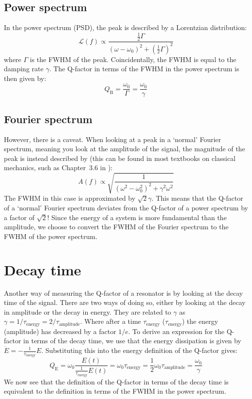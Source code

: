 \subsection{Power spectrum}
In the power spectrum (PSD), the peak is described by a Lorentzian distribution:
\begin{equation}
    \mathcal{L}(f) \propto \frac{\frac{1}{2} \Gamma}{(\omega - \omega_0)^2 + \left(\frac{1}{2} \Gamma\right)^2}
\end{equation}
where $\Gamma$ is the FWHM of the peak. Coincidentally, the FWHM is equal to the damping rate $\gamma$. The Q-factor in terms of the FWHM in the power spectrum is then given by:
\begin{equation}
    Q_\text{B} = \frac{\omega_0}{\Gamma} = \frac{\omega_0}{\gamma}
\end{equation}

\subsection{Fourier spectrum}
However, there is a caveat. When looking at a peak in a `normal' Fourier spectrum, meaning you look at the amplitude of the signal, the magnitude of the peak is instead described by (this can be found in most textbooks on classical mechanics, such as Chapter~3.6 in \textcite{fowles_analytical_2005}):
\begin{equation}
    A(f) \propto \sqrt{\frac{1}{(\omega^2 - \omega_0^2)^2 + \gamma^2\omega^2}}
\end{equation}
The FWHM in this case is approximated by $\sqrt{2}\gamma$. This means that the Q-factor of a `normal' Fourier spectrum deviates from the Q-factor of a power spectrum by a factor of $\sqrt{2}$! Since the energy of a system is more fundamental than the amplitude, we choose to convert the FWHM of the Fourier spectrum to the FWHM of the power spectrum.

\section{Decay time}
Another way of measuring the Q-factor of a resonator is by looking at the decay time of the signal. There are two ways of doing so, either by looking at the decay in amplitude or the decay in energy. They are related to $\gamma$ as $\gamma = 1 / \tau_\text{energy} = 2 / \tau_\text{amplitude}$. Where after a time $\tau_\text{energy}$ ($\tau_\text{energy}$) the energy (amplitude) has decreased by a factor $1/e$. To derive an expression for the Q-factor in terms of the decay time, we use that the energy dissipation is given by $\dot{E} = -\frac{1}{\tau_\text{energy}}E$. Substituting this into the energy definition of the Q-factor gives:
\begin{equation}
    Q_\text{E} = \omega_0 \frac{E(t)}{\frac{1}{\tau_\text{energy}} E(t)} = \omega_0 \tau_\text{energy} = \frac{1}{2} \omega_0 \tau_\text{amplitude} = \frac{\omega_0}{\gamma}
\end{equation}
We now see that the definition of the Q-factor in terms of the decay time is equivalent to the definition in terms of the FWHM in the power spectrum.

